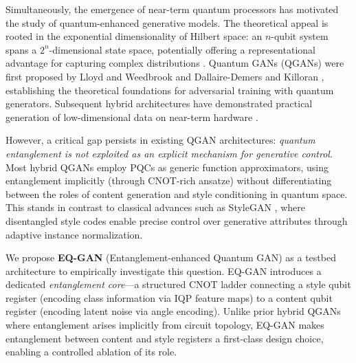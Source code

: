 \documentclass[twocolumn]{article}
\begin{document}
Simultaneously, the emergence of near-term quantum processors has motivated
the study of quantum-enhanced generative models. The theoretical appeal is
rooted in the exponential dimensionality of Hilbert space: an $n$-qubit
system spans a $2^n$-dimensional state space, potentially offering a
representational advantage for capturing complex distributions
\cite{biamonte2017quantum}. Quantum GANs (QGANs) were first proposed by
Lloyd and Weedbrook \cite{lloyd2018quantum} and Dallaire-Demers and Killoran
\cite{dallaire2018quantum}, establishing the theoretical foundations for
adversarial training with quantum generators. Subsequent hybrid architectures
have demonstrated practical generation of low-dimensional data on near-term
hardware \cite{huang2021experimental, tsang2023mosaiq, rudolph2024latent}.

However, a critical gap persists in existing QGAN architectures: \emph{quantum
entanglement is not exploited as an explicit mechanism for generative control}.
Most hybrid QGANs employ PQCs as generic function approximators, using
entanglement implicitly (through CNOT-rich ansatze) without differentiating
between the roles of content generation and style conditioning in quantum
space. This stands in contrast to classical advances such as StyleGAN
\cite{karras2019style}, where disentangled style codes enable precise control
over generative attributes through adaptive instance normalization.

We propose \textbf{EQ-GAN} (Entanglement-enhanced Quantum GAN) as a testbed
architecture to empirically investigate this question. EQ-GAN introduces a
dedicated \emph{entanglement core}—a structured CNOT ladder connecting a style
qubit register (encoding class information via IQP feature maps) to a content
qubit register (encoding latent noise via angle encoding). Unlike prior hybrid
QGANs where entanglement arises implicitly from circuit topology, EQ-GAN
makes entanglement between content and style registers a first-class design
choice, enabling a controlled ablation of its role.
\end{document}
